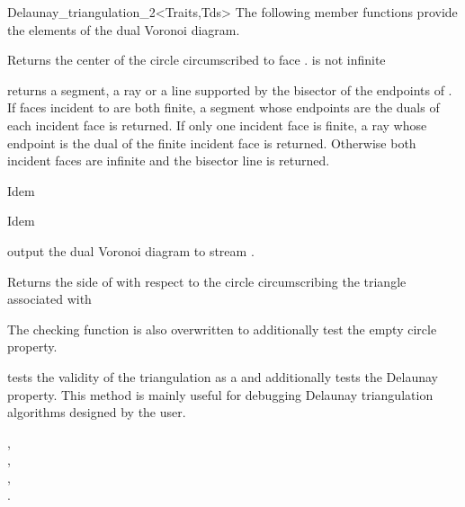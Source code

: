\begin{ccRefClass}{Delaunay_triangulation_2<Traits,Tds>}
The following member functions provide the elements of the
dual Voronoi diagram.

{Returns the center of the circle circumscribed to face .
\ccPrecond {} is not infinite}

{returns a segment, a ray or a line supported by the bisector of the
endpoints of .
If faces incident to  are both finite, a segment whose endpoints are the
duals of each incident face is returned. If only one incident face is
finite, a
ray whose endpoint is the dual of the finite incident face is returned.
Otherwise both incident faces
are infinite and the bisector line is returned.}

{Idem}

{Idem}

{output the dual Voronoi diagram to stream .}


\ccPredicates
{}
\ccThreeToTwo

{Returns the side of  with respect to the circle circumscribing
 the triangle associated with }

\begin{ccAdvanced}

The checking function  is also overwritten
to additionally test the empty circle property.

{ tests the validity of the triangulation as a 
and additionally tests the Delaunay property. This method is
 mainly  useful for debugging Delaunay triangulation algorithms designed by
 the user.}
\end{ccAdvanced}




\ccSeeAlso

, \\
, \\
, \\
.





\end{ccRefClass}

